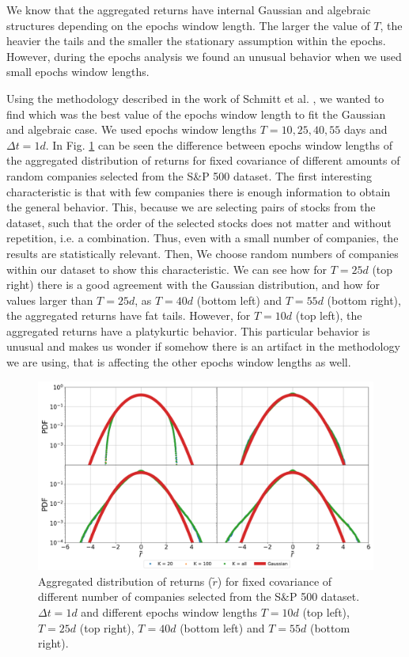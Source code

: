We know that the aggregated returns have internal Gaussian and algebraic
structures depending on the epochs window length. The larger the value of $T$,
the heavier the tails and the smaller the stationary assumption within the
epochs. However, during the epochs analysis we found an unusual behavior when
we used small epochs window lengths.

Using the methodology described in the work of Schmitt et al.
\cite{non_stationarity_fin_guhr}, we wanted to find which was the best value of
the epochs window length to fit the Gaussian and algebraic case. We used epochs
window lengths $T = 10, 25, 40, 55$ days and $\Delta t = 1d$. In Fig.
\ref{fig:window_comparison} can be seen the difference between epochs
window lengths of the aggregated distribution of returns for fixed covariance
of different amounts of random companies selected from the S\&P 500 dataset.
The first interesting characteristic is that with few companies there is enough
information to obtain the general behavior. This, because we are selecting
pairs of stocks from the dataset, such that the order of the selected stocks
does not matter and without repetition, i.e. a combination. Thus, even with
a small number of companies, the results are statistically relevant. Then, We
choose random numbers of companies within our dataset to show this
characteristic. We can see how for $T=25d$ (top right) there is a good agreement
with the Gaussian distribution, and how for values larger than $T=25d$, as
$T=40d$ (bottom left) and $T=55d$ (bottom right), the aggregated returns have
fat tails. However, for $T=10d$ (top left), the aggregated returns have a
platykurtic behavior. This particular behavior is unusual and makes us wonder
if somehow there is an artifact in the methodology we are using, that is
affecting the other epochs window lengths as well.

\begin{figure}[htbp]
    \centering
    \includegraphics[width=0.8\columnwidth]
    {figures/05_window_comparison.png}
    \caption{Aggregated distribution of returns ($\tilde{r}$) for fixed
             covariance of different number of companies selected from the S\&P
             500 dataset. $\Delta t = 1d$ and different epochs window lengths
             $T=10d$ (top left), $T=25d$ (top right), $T=40d$ (bottom left) and
             $T=55d$ (bottom right).}
    \label{fig:window_comparison}
\end{figure}

